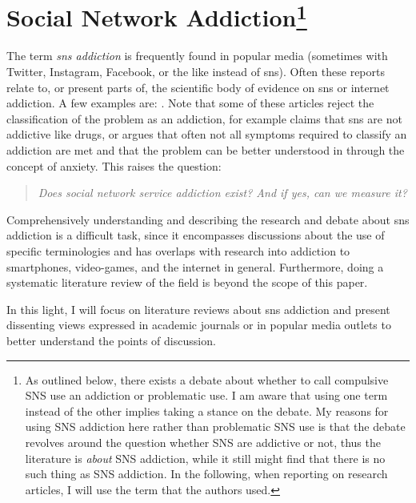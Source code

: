 \section[Social Network Addiction]{Social Network Addiction\footnote{As outlined below, there exists a debate about whether to call compulsive SNS use an addiction or problematic use. I am aware that using one term instead of the other implies taking a stance on the debate. My reasons for using SNS addiction here rather than problematic SNS use is that the debate revolves around the question whether SNS are addictive or not, thus the literature is \emph{about} SNS addiction, while it still might find that there is no such thing as SNS addiction. In the following, when reporting on research articles, I will use the term that the authors used.}}
\label{sec:sns_add}

The term \textit{\gls{sns} addiction} is frequently found in popular media (sometimes with Twitter, Instagram, Facebook, or the like instead of \gls{sns}). 
Often these reports relate to, or present parts of, the scientific body of evidence on \gls{sns} or internet addiction. A few examples are: \citep{rosen_smart_2019, flores_ex-facebook_2020, flanagan_you_2021, john_too_2021, duff_im_2021,  xue_science_2021}.
Note that some of these articles reject the classification of the problem as an addiction, \citet{john_too_2021} for example claims that \gls{sns} are not addictive like drugs, or \citet{rosen_smart_2019} argues that often not all symptoms required to classify an addiction are met and that the problem can be better understood in through the concept of anxiety.
This raises the question: 
\begin{quote}
    \textit{Does social network service addiction exist? And if yes, can we measure it?}
\end{quote}
Comprehensively understanding and describing the research and debate about \gls{sns} addiction is a difficult task, since it encompasses discussions about the use of specific terminologies and has overlaps with research into addiction to smartphones, video-games, and the internet in general.
Furthermore, doing a systematic literature review of the field is beyond the scope of this paper.

In this light, I will focus on literature reviews about \gls{sns} addiction and present dissenting views expressed in academic journals or in popular media outlets to better understand the points of discussion.

